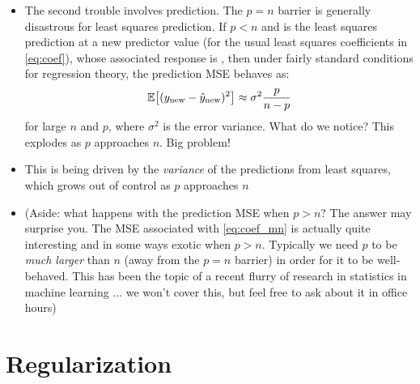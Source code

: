 \documentclass{article}
\begin{document}
\begin{itemize}
\item The second trouble involves prediction. The $p = n$ barrier is generally
  disastrous for least squares prediction. If $p < n$ and  is the least squares prediction at a new predictor
  value  (for \smash{$\hbeta$} the usual least squares
  coefficients in \eqref{eq:coef}), whose associated response is
  , then under fairly standard conditions for regression
  theory,
  the prediction MSE behaves as: 
  \[
  \mathbb{E} \big[ (y_{\text{new}} - \hat{y}_{\text{new}})^2 \big] \approx \sigma^2
  \frac{p}{n-p} 
  \]
  for large $n$ and $p$, where $\sigma^2$ is the error variance. What do we
  notice? This explodes as $p$ approaches $n$. Big problem!

\item This is being driven by the \emph{variance} of the predictions from least 
  squares, which grows out of control as $p$ approaches $n$

\item (Aside: what happens with the prediction MSE when $p > n$? The answer may
  surprise you. The MSE associated with \eqref{eq:coef_mn} is actually quite
  interesting and in some ways exotic when $p > n$. Typically we need $p$ to be
  \emph{much larger} than $n$ (away from the $p = n$ barrier) in order for it to
  be well-behaved. This has been the topic of a recent flurry of research in
  statistics in machine learning ...  we won't cover this, but feel free to ask
  about it in office hours)     
\end{itemize}

\section{Regularization}
\end{document}

